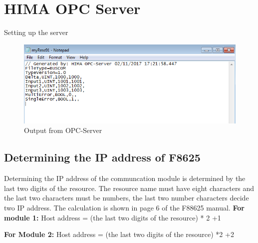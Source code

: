 \newpage
\section{HIMA OPC Server}

Setting up the server

\begin{figure}[!htb]
    \centering
    \includegraphics[scale=0.9]{images/del3}
     \caption{Output from OPC-Server}
\end{figure}

\subsection{Determining the IP address of F8625}
Determining the IP address of the communcation module is determined by the last two digits of the resource. The resource name must have eight characters and the last two characters must be numbers, the last two number characters decide two IP address. The calculation is shown in page 6 of the F88625 manual.
\textbf{For module 1:}
Host address = (the last two digits of the resource) * 2 +1 

\textbf{For Module 2:}
Host address = (the last two digits of the resource) *2 +2


